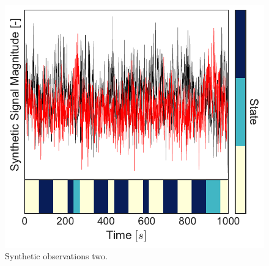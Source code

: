 \documentclass[aspectratio=169]{beamer}
\begin{document}
\begin{frame}
\begin{columns}[c]
        \begin{figure}
            \includegraphics[width=1.0\linewidth]{synthetic-data-plot-data2.pdf}
            \caption{Synthetic observations two.}
        \end{figure}

    \end{columns}

\end{frame}

\end{document}

